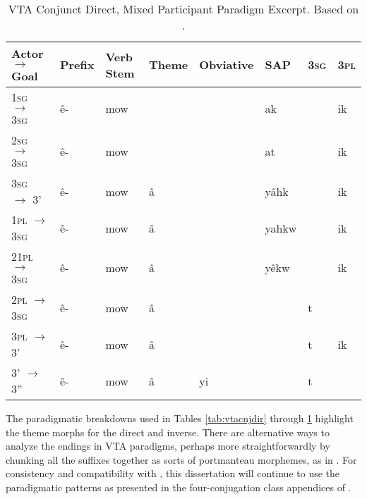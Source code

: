 \begin{table}
\begin{tabular}{llllllll}
    \toprule
Actor $\rightarrow$   Goal                                                                                                                           & Prefix & Verb Stem & Theme & Obviative & SAP   & 3\textsc{sg} & 3\textsc{pl} \\
    \midrule
1\textsc{sg} $\rightarrow$   3\textsc{sg}       & ê-     &  mow         &       &           & ak    &                               & ik                            \\
2\textsc{sg} $\rightarrow$   3\textsc{sg}       & ê-     &  mow         &       &           & at    &                               & ik                            \\
3\textsc{sg} $\rightarrow$   3'                 & ê-     &  mow         & â     &           & yâhk  &                               & ik                            \\
1\textsc{pl} $\rightarrow$   3\textsc{sg}       & ê-     &  mow         & â     &           & yahkw &                               & ik                            \\
21\textsc{pl} $\rightarrow$   3\textsc{sg}      & ê-     &  mow         & â     &           & yêkw  &                               & ik                            \\
2\textsc{pl} $\rightarrow$ 3\textsc{sg}         & ê-     &  mow         & â     &           &       & t                             &                               \\
3\textsc{pl} $\rightarrow$   3'                 & ê-     &  mow         & â     &           &       & t                             & ik                            \\
3' $\rightarrow$   3''                          & ê-     &  mow         & â     & yi        &       & t                             &                              \\
    \bottomrule
  \end{tabular}
  \caption{
    VTA Conjunct Direct, Mixed Participant Paradigm Excerpt. Based on \citet[419]{Wolvengrey2011}. \label{tab:vtacnjdir2}
  }
\end{table}



The paradigmatic breakdowns used in Tables \ref{tab:vtacnjdir} through \ref{tab:vtacnjdir2} highlight the theme morphs for the direct and inverse. There are alternative ways to analyze the endings in VTA paradigms, perhaps more straightforwardly by chunking all the suffixes together as sorts of portmanteau morphemes, as in \citet{harrigan2017learning}. For consistency and compatibility with \citet{Wolvengrey2011}, this dissertation will continue to use the paradigmatic patterns as presented in the four-conjugation class appendices of \citet{Wolvengrey2011}.


